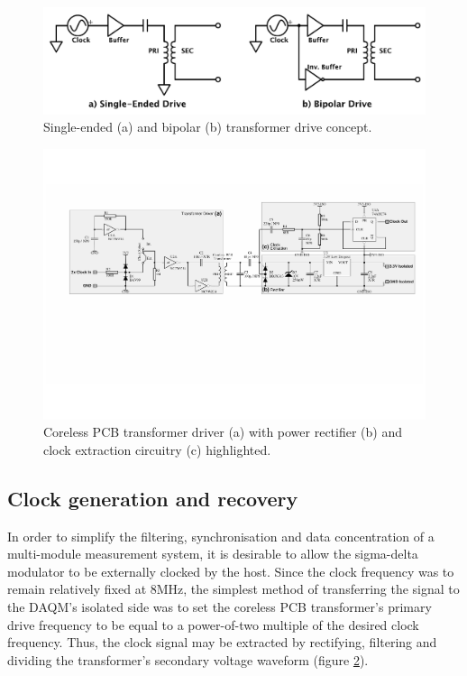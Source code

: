 \documentclass[conference]{IEEEtran}
\begin{document}
	\begin{figure}[t]
		\centering
		\includegraphics[width=1\columnwidth]{./img/BIvsSE}
		\caption{Single-ended (a) and bipolar (b) transformer drive concept.}
		\label{fig:BIvsSE}
	\end{figure}
%	
	\begin{figure}[t]
		\centering
		\includegraphics[width=1.0\textwidth]{./img/TFpwrclk_BW}
		\caption{Coreless PCB transformer driver (a) with power rectifier (b) and clock extraction circuitry (c) highlighted.}
		\label{fig:TFpwrclk}
	\end{figure}	
	
	\subsection{Clock generation and recovery}
	In order to simplify the filtering, synchronisation and data concentration of a multi-module measurement system, it is desirable to allow the sigma-delta modulator to be externally clocked by the host.  Since the clock frequency was to remain relatively fixed at 8MHz, the simplest method of transferring the signal to the DAQM's isolated side was to set the coreless PCB transformer's primary drive frequency to be equal to a power-of-two multiple of the desired clock frequency.  Thus, the clock signal may be extracted by rectifying, filtering and dividing the transformer's secondary voltage waveform (figure \ref{fig:TFpwrclk}).
	
\end{document}
